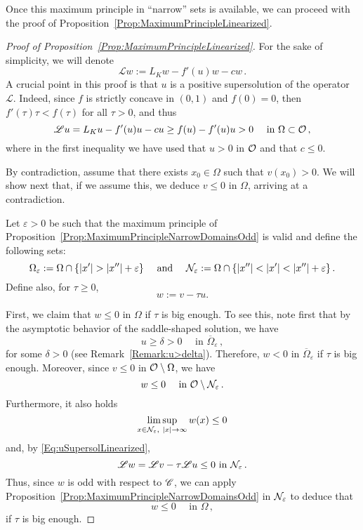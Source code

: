 Once this maximum principle in ``narrow'' sets is available, we can proceed with the proof of Proposition~\ref{Prop:MaximumPrincipleLinearized}.

\begin{proof}[Proof of Proposition~\ref{Prop:MaximumPrincipleLinearized}]
    


	For the sake of simplicity, we will denote 
	$$
	\mathscr{L} w := L_K w - f'(u)w - cw\,.
	$$
	A crucial point in this proof is that $u$ is a positive supersolution of the operator $\mathscr{L}$. Indeed, since $f$ is strictly concave in $(0,1)$ and $f(0)=0$, then $f'(\tau)\tau<f(\tau)$ for all $\tau>0$, and thus 
	\begin{equation}
	\label{Eq:uSupersolLinearized}
	\mathscr{L} u = L_K u - f'(u)u - cu \geq f(u) - f'(u)u > 0 \quad \textrm{ in } \Omega \subset \mathcal{O}\,,
	\end{equation}
	where in the first inequality we have used that $u>0$ in $\mathcal{O}$ and that $c\leq 0$.
	
	
	
	
	By contradiction, assume that there exists $x_0\in \Omega$ such that $v(x_0)> 0$. We will show next that, if we assume this, we deduce $v\leq 0$ in $\Omega$, arriving at a contradiction.
	
	
	
	
	Let $\varepsilon > 0$ be such that the maximum principle of Proposition~\ref{Prop:MaximumPrincipleNarrowDomainsOdd} is valid and define the following sets:
	$$
	\Omega_\varepsilon := \Omega \cap \{|x'| > |x''| + \varepsilon\}\quad \textrm{ and } \quad 
	\mathcal{N}_\varepsilon := \Omega \cap \{|x''| < |x'| < |x''| + \varepsilon\}\,.
	$$
	Define also, for $\tau \geq 0$, 
	$$
	w := v - \tau u.
	$$
	
	First, we claim that $w\leq 0$ in $\Omega$ if $\tau$ is big enough. To see this, note first that by the asymptotic behavior of the saddle-shaped solution, we have 
	\begin{equation}
		\label{Eq:u>delta}
		u \geq \delta > 0 \quad \textrm{ in } \overline{\Omega}_\varepsilon\,,
	\end{equation}
	for some $\delta >0$ (see Remark~\ref{Remark:u>delta}). Therefore, $w < 0$ in $\overline{\Omega}_\varepsilon$ if $\tau$ is big enough. Moreover, since $v\leq 0$ in $\mathcal{O}\setminus\Omega$, we have 
	$$
	w \leq 0 \quad \textrm{ in } \mathcal{O} \setminus \mathcal{N}_\varepsilon\,.
	$$
	Furthermore, it also holds
	$$
	\limsup_{x\in \mathcal{N}_\varepsilon, \ |x|\to \infty} w(x) \leq 0
	$$
	and, by \eqref{Eq:uSupersolLinearized},
	$$
	\mathscr{L} w = \mathscr{L} v - \tau \mathscr{L} u \leq 0 \textrm{ in } \mathcal{N}_\varepsilon\,.
	$$
	Thus, since $w$ is odd with respect to $\mathscr{C}$, we can apply Proposition~\ref{Prop:MaximumPrincipleNarrowDomainsOdd} in $\mathcal{N}_\varepsilon$ to deduce that
	$$
	w \leq 0 \quad \textrm{ in } \Omega\,,
	$$
	if $\tau$ is big enough.
	

\end{proof}

